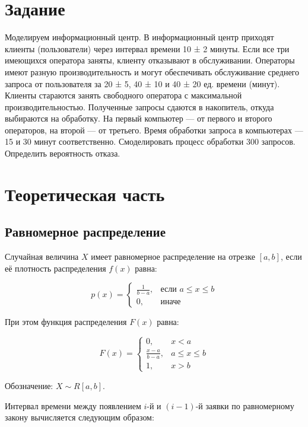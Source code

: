 \section{Задание}

Моделируем информационный центр. В информационный центр приходят клиенты (пользователи) через интервал времени 10 ± 2 минуты. Если все три имеющихся оператора заняты, клиенту отказывают в обслуживании. Операторы имеют разную производительность и могут обеспечивать обслуживание среднего запроса от пользователя за 20 ± 5, 40 ± 10 и 40 ± 20 ед. времени (минут). Клиенты стараются занять свободного оператора с максимальной производительностью. Полученные запросы сдаются в накопитель, откуда выбираются на обработку. На первый компьютер — от первого и второго операторов, на второй — от третьего. Время обработки запроса в компьютерах — 15 и 30 минут соответственно. Смоделировать процесс обработки 300 запросов. Определить вероятность отказа.

\section{Теоретическая часть}

\subsection{Равномерное распределение}

Случайная величина $X$ имеет равномерное распределение на отрезке $[a, b]$, если её плотность распределения $f(x)$ равна:

\begin{equation}
p(x) = \begin{cases}
\frac{1}{b-a}, & \text{если } a \leq x \leq b \\
0, & \text{иначе}
\end{cases}
\end{equation}

При этом функция распределения $F(x)$ равна:

\begin{equation}
F(x) = \begin{cases}
0, & x < a \\
\frac{x-a}{b-a}, & a \leq x \leq b \\
1, & x > b
\end{cases}
\end{equation}

Обозначение: $X \sim R[a, b]$.

Интервал времени между появлением $i$-й и $(i-1)$-й заявки по равномерному закону вычисляется следующим образом:

